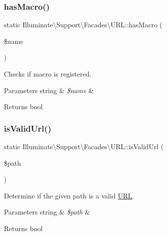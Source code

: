 \subsubsection{\texorpdfstring{has\+Macro()}{hasMacro()}}
{\footnotesize\ttfamily static Illuminate\textbackslash{}\+Support\textbackslash{}\+Facades\textbackslash{}\+U\+R\+L\+::has\+Macro (\begin{DoxyParamCaption}\item[{}]{\$name }\end{DoxyParamCaption})\hspace{0.3cm}{\ttfamily [static]}}

Checks if macro is registered.


\begin{DoxyParams}[1]{Parameters}
string & {\em \$name} & \\
\hline
\end{DoxyParams}
\begin{DoxyReturn}{Returns}
bool 
\end{DoxyReturn}
\mbox{\label{class_illuminate_1_1_support_1_1_facades_1_1_u_r_l_ac55e67d752a9ae77a71d8f907742083d}} 
\subsubsection{\texorpdfstring{is\+Valid\+Url()}{isValidUrl()}}
{\footnotesize\ttfamily static Illuminate\textbackslash{}\+Support\textbackslash{}\+Facades\textbackslash{}\+U\+R\+L\+::is\+Valid\+Url (\begin{DoxyParamCaption}\item[{}]{\$path }\end{DoxyParamCaption})\hspace{0.3cm}{\ttfamily [static]}}

Determine if the given path is a valid \mbox{\hyperlink{class_illuminate_1_1_support_1_1_facades_1_1_u_r_l}{U\+RL}}.


\begin{DoxyParams}[1]{Parameters}
string & {\em \$path} & \\
\hline
\end{DoxyParams}
\begin{DoxyReturn}{Returns}
bool 
\end{DoxyReturn}
\mbox{\label{class_illuminate_1_1_support_1_1_facades_1_1_u_r_l_adb4bd9822b104223dc4d2aa8e7dfdb69}} 
